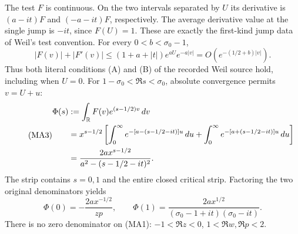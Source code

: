 The test $F$ is continuous. On the two intervals separated by $U$ its
derivative is $(a-it)F$ and $(-a-it)F$, respectively. The average derivative
value at the single jump is $-it$, since $F(U)=1$. These are exactly the
first-kind jump data of Weil's test convention. For every
$0<b<\sigma_0-1$,
\[
 |F(v)|+|F'(v)|\le(1+a+|t|)e^{aU}e^{-a|v|}
 =O(e^{-(1/2+b)|v|}).
\]
Thus both literal conditions (A) and (B) of the recorded Weil source hold,
including when $U=0$.
For $1-\sigma_0<\Re s<\sigma_0$, absolute convergence permits $v=U+u$:
\begin{equation}\tag{MA3}\begin{aligned}
 \Phi(s)&:=\int_\mathbb R F(v)e^{(s-1/2)v}\,d v\\
 &=x^{s-1/2}\left[
 \int_0^\infty e^{-[a-(s-1/2-it)]u}\,d u
 +\int_0^\infty e^{-[a+(s-1/2-it)]u}\,d u\right]\\
 &=\frac{2a x^{s-1/2}}{a^2-(s-1/2-it)^2}.
\end{aligned}\end{equation}
The strip contains $s=0,1$ and the entire closed critical strip. Factoring
the two original denominators yields
\begin{equation}\tag{MA4}
 \Phi(0)=-\frac{2a x^{-1/2}}{zp},\qquad
 \Phi(1)=\frac{2a x^{1/2}}{(\sigma_0-1+it)(\sigma_0-it)}.
\end{equation}
There is no zero denominator on (MA1): $-1<\Re z<0$, $1<\Re w,\Re p<2$.

